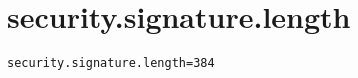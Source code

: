 \section{security.signature.length}
\label{configuration:SecuritySignatureLength}
\ClearAPI
\TODO
{}
\begin{lstlisting}[style=Props,caption={Usage example for \textit{security.signature.length}}]
security.signature.length=384
\end{lstlisting}